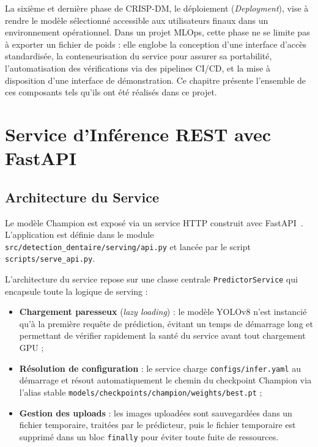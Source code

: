 \documentclass{rapportENSIAS}
\newcommand{\projectpath}[1]{\texttt{#1}}
\begin{document}
La sixième et dernière phase de CRISP-DM, le déploiement (\textit{Deployment}),
vise à rendre le modèle sélectionné accessible aux utilisateurs finaux dans
un environnement opérationnel. Dans un projet MLOps, cette phase ne se limite
pas à exporter un fichier de poids : elle englobe la conception d'une interface
d'accès standardisée, la conteneurisation du service pour assurer sa portabilité,
l'automatisation des vérifications via des pipelines CI/CD, et la mise à disposition
d'une interface de démonstration. Ce chapitre présente l'ensemble de ces composants
tels qu'ils ont été réalisés dans ce projet.

\section{Service d'Inférence REST avec FastAPI}

\subsection{Architecture du Service}

Le modèle Champion est exposé via un service HTTP construit avec
FastAPI~\cite{fastapi2019}. L'application est définie dans le module
\projectpath{src/detection\_dentaire/serving/api.py} et lancée par le
script \projectpath{scripts/serve\_api.py}.

L'architecture du service repose sur une classe centrale \texttt{PredictorService}
qui encapsule toute la logique de serving :

\begin{itemize}
    \item \textbf{Chargement paresseux} (\textit{lazy loading}) : le modèle
          YOLOv8 n'est instancié qu'à la première requête de prédiction,
          évitant un temps de démarrage long et permettant de vérifier
          rapidement la santé du service avant tout chargement GPU ;
    \item \textbf{Résolution de configuration} : le service charge
          \projectpath{configs/infer.yaml} au démarrage et résout
          automatiquement le chemin du checkpoint Champion via l'alias stable
          \projectpath{models/checkpoints/champion/weights/best.pt} ;
    \item \textbf{Gestion des uploads} : les images uploadées sont sauvegardées
          dans un fichier temporaire, traitées par le prédicteur, puis
          le fichier temporaire est supprimé dans un bloc \texttt{finally}
          pour éviter toute fuite de ressources.
\end{itemize}
\end{document}
